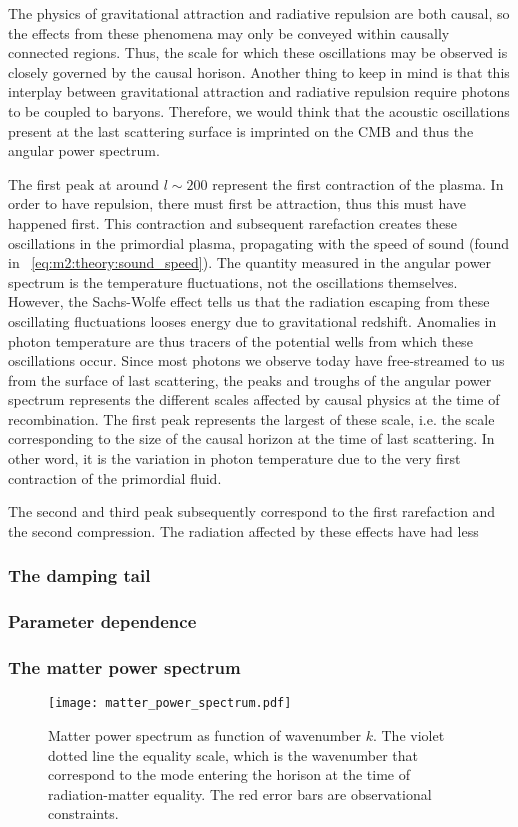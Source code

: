         The physics of gravitational attraction and radiative repulsion are both causal, so the effects from these phenomena may only be conveyed within causally connected regions. Thus, the scale for which these oscillations may be observed is closely governed by the causal horison. Another thing to keep in mind is that this interplay between gravitational attraction and radiative repulsion require photons to be coupled to baryons. Therefore, we would think that the acoustic oscillations present at the last scattering surface is imprinted on the CMB and thus the angular power spectrum.

        The first peak at around $l\sim200$ represent the first contraction of the plasma. In order to have repulsion, there must first be attraction, thus this must have happened first. This contraction and subsequent rarefaction creates these oscillations in the primordial plasma, propagating with the speed of sound (found in ~\cref{eq:m2:theory:sound_speed}). The quantity measured in the angular power spectrum is the temperature fluctuations, not the oscillations themselves. However, the Sachs-Wolfe effect tells us that the radiation escaping from these oscillating fluctuations looses energy due to gravitational redshift. Anomalies in photon temperature are thus tracers of the potential wells from which these oscillations occur. Since most photons we observe today have free-streamed to us from the surface of last scattering, the peaks and troughs of the angular power spectrum represents the different scales affected by causal physics at the time of recombination. The first peak represents the largest of these scale, i.e. the scale corresponding to the size of the causal horizon at the time of last scattering. In other word, it is the variation in photon temperature due to the very first contraction of the primordial fluid. 

        The second and third peak subsequently correspond to the first rarefaction and the second compression. The radiation affected by these effects have had less 

    \subsubsection{The damping tail}

    \subsubsection{Parameter dependence}


    \subsubsection{The matter power spectrum}
    
    \begin{figure}
        \texttt{[image: matter\_power\_spectrum.pdf]}
        \caption{Matter power spectrum as function of wavenumber $k$. The violet dotted line the equality scale, which is the wavenumber that correspond to the mode entering the horison at the time of radiation-matter equality. The red error bars are observational constraints.}
        \label{fig:m4:matter_power_spectrum}
    \end{figure}